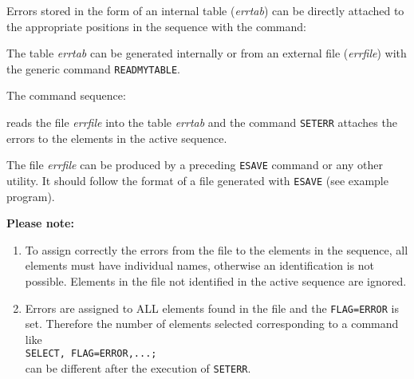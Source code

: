 Errors stored in the form of an internal table ({\it errtab}) can  be
directly attached to the appropriate positions in the sequence with the
command:  


The table {\it errtab} can be generated internally or from an
external file ({\it errfile}) with the generic command {\tt READMYTABLE}.  
 

The command sequence: 

reads the file {\it errfile} into the table {\it errtab} and the
command {\tt SETERR} attaches the errors to the elements in the active
sequence.  

The file {\it errfile} can be produced by a preceding {\tt ESAVE} command
or any other utility. It should follow the format of a file generated
with {\tt ESAVE} (see example program). 

{\bf Please note:}
\begin{enumerate}
   \item To assign correctly the errors from the file to the elements in
     the sequence, all elements must have individual names, otherwise an
     identification is not possible. Elements in the file not identified
     in the active sequence are ignored.  
   \item Errors are assigned to ALL elements found in the file and the
     {\tt FLAG=ERROR} is set. Therefore the number of elements selected
     corresponding to a command like
     \\ {\tt SELECT, FLAG=ERROR,...;}
     \\ can be different after the execution of {\tt SETERR}. 
\end{enumerate}


